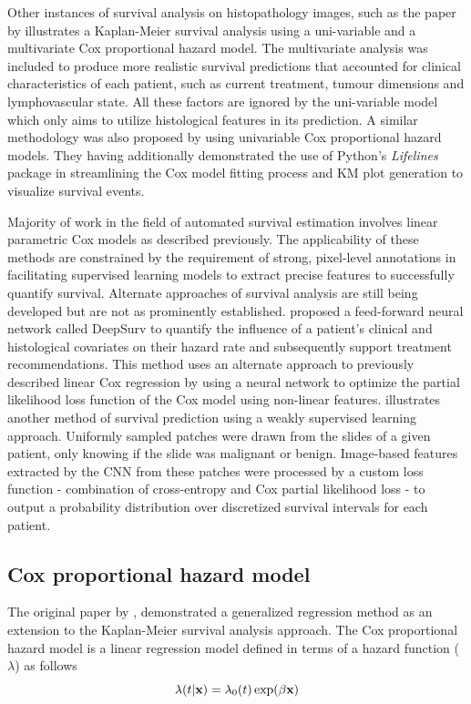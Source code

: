 \documentclass{l4proj}
\begin{document}
Other instances of survival analysis on histopathology images, such as the paper by \cite{Wetstein2022} illustrates a Kaplan-Meier survival analysis using a uni-variable and a multivariate Cox proportional hazard model. The multivariate analysis was included to produce more realistic survival predictions that accounted for clinical characteristics of each patient, such as current treatment, tumour dimensions and lymphovascular state. All these factors are ignored by the uni-variable model which only aims to utilize histological features in its prediction. A similar methodology was also proposed by \cite{Liu2022} using univariable Cox proportional hazard models. They having additionally demonstrated the use of Python's \textit{Lifelines} package in streamlining the Cox model fitting process and KM plot generation to visualize survival events. 

Majority of work in the field of automated survival estimation involves linear parametric Cox models as described previously. The applicability 
of these methods are constrained by the requirement of strong, pixel-level annotations in facilitating supervised learning models to extract precise features to successfully quantify survival. Alternate approaches of survival analysis are still being developed but are not as prominently established.  \cite{katzman2018deepsurv} proposed a feed-forward neural network called DeepSurv to quantify the influence of a patient's clinical and histological covariates on their hazard rate and subsequently support treatment recommendations. This method uses an alternate approach to  previously described linear Cox regression by using a neural network to optimize the partial likelihood loss function of the Cox model using non-linear features. \cite{wulczyn2020deep} illustrates another method of survival prediction using a weakly supervised learning approach. Uniformly sampled patches were drawn from the slides of a given patient, only knowing if the slide was malignant or benign. Image-based features extracted by the CNN from these patches were processed by a custom loss function - combination of cross-entropy and Cox partial likelihood loss - to output a probability distribution over discretized survival intervals for each patient.

\subsection{Cox proportional hazard model}
The original paper by \cite{cox1972regression}, demonstrated a generalized regression method as an extension to the Kaplan-Meier survival analysis approach. The Cox proportional hazard model is a linear regression model defined in terms of a hazard function (\(\lambda\)) as follows
\begin{equation}
    \centering
    \lambda (t | \textbf{x}) = \lambda_0 (t) \exp (\beta \textbf{x})
    \label{eq:hazard model}
\end{equation}
\end{document}
